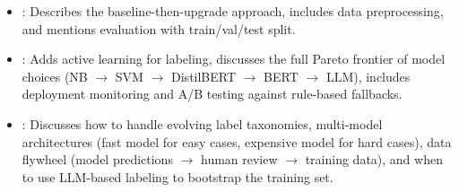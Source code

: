 \begin{interviewq}

\goodgreat
\begin{itemize}
    \item {}: Describes the baseline-then-upgrade approach, includes data
    preprocessing, and mentions evaluation with train/val/test split.
    \item {}: Adds active learning for labeling, discusses the full Pareto
    frontier of model choices (NB $\to$ SVM $\to$ DistilBERT $\to$ BERT $\to$ LLM),
    includes deployment monitoring and A/B testing against rule-based fallbacks.
    \item {}: Discusses how to handle evolving label taxonomies, multi-model
    architectures (fast model for easy cases, expensive model for hard cases), data flywheel
    (model predictions $\to$ human review $\to$ training data), and when to use LLM-based
    labeling to bootstrap the training set.
\end{itemize}

\end{interviewq}

\vspace{0.5em}

